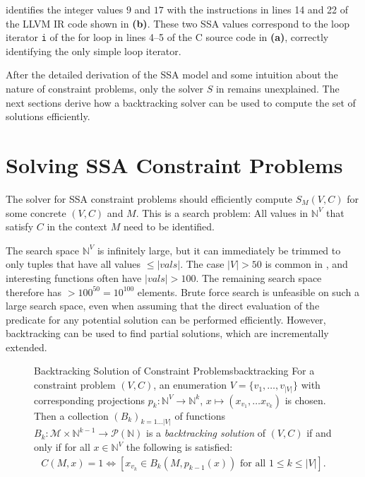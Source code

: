      identifies the integer values $9$ and $17$ with the
    instructions in lines 14 and 22 of the LLVM IR code shown in
     {\bf(b)}.
    These two SSA values correspond to the loop iterator \texttt{i} of the for
    loop in lines 4--5 of the C source code in  {\bf(a)},
    correctly identifying the only simple loop iterator.

    After the detailed derivation of the SSA model and some intuition about the
    nature of constraint problems, only the solver $S$ in
     remains unexplained.
    The next sections derive how a backtracking solver can be used to
    compute the set of solutions efficiently.

\section{Solving SSA Constraint Problems}
\label{sec:constraintsolving}

    The solver for SSA constraint problems should efficiently compute $S_M(V,C)$
    for some concrete $(V,C)$ and $M$.
    This is a search problem:
    All values in $\mathbb N^V$ that satisfy $C$ in the context $M$ need to be
    identified.

    The search space $\mathbb N^V$ is infinitely large, but it can immediately
    be trimmed to only tuples that have all values $\leq|vals|$.
    The case \mbox{$|V|>50$} is common in
    , and interesting
    functions often have \mbox{$|vals|>100$}.
    The remaining search space therefore has $>100^{50}=10^{100}$ elements.
    Brute force search is unfeasible on such a large search space, even when assuming
    that the direct evaluation of the predicate for any potential solution can
    be performed efficiently.
    However, backtracking can be used to find partial solutions, which are
    incrementally extended.

\begin{figure}[h]
    \begin{definition}{Backtracking Solution of Constraint Problems}{backtracking}
        For a constraint problem $(V,C)$, an enumeration
        $V=\{v_1,\dots,v_{|V|}\}$ with corresponding projections
        $p_k\colon\mathbb N^V\rightarrow\mathbb N^k$,
        $x\mapsto(x_{v_1},\dots x_{v_k})$ is chosen.
        Then a collection $(B_k)_{k=1\dots |V|}$ of functions
        $B_k:\mathcal M\times \mathbb N^{k-1}\rightarrow\mathcal P(\mathbb N)$
        is a {\em backtracking solution} of $(V,C)$ if and only if for all
        $x\in\mathbb N^V$ the following is satisfied:
        \begin{align}
            C(M,x)=1\iff\left[x_{v_k}\in B_k(M,p_{k-1}(x))\text{ for all }1\leq k\leq |V|\right].
        \end{align}
    \end{definition}
\end{figure}

